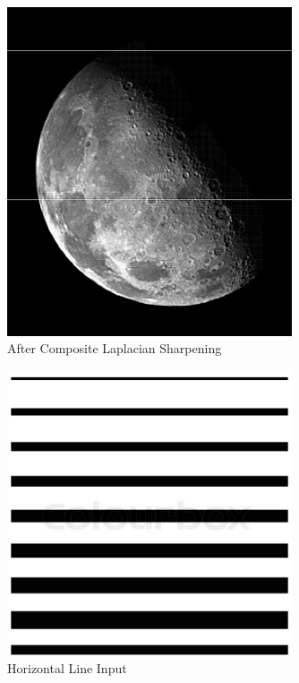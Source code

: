\documentclass{article}
\begin{document}
  \begin{figure}[!htb]
    \centering
    \includegraphics[width=0.75\textwidth]{assets/MoonAfterSharpening.png}
    \caption{After Composite Laplacian Sharpening}
    \label{fig:sharpened}
  \end{figure}

  \begin{figure}[!htb]
    \centering
    \includegraphics[width=0.75\textwidth]{assets/horizontal_line.png}
    \caption{Horizontal Line Input}
    \label{fig:horizontal-line}
  \end{figure}
\end{document}
